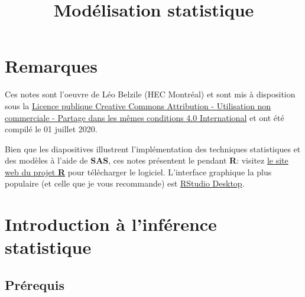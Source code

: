 \documentclass[
  11pt,
  letterpaper,
]{book}
\title{Modélisation statistique}
\author{}
\date{\vspace{-2.5em}}
\let\oldhref\href
\renewcommand{\href}[2]{#2\footnote{\url{#1}}}
\begin{document}
\maketitle

\let\href\oldhref

{
\setcounter{tocdepth}{1}
\tableofcontents
}
\hypertarget{remarques}{%
\chapter*{Remarques}\label{remarques}}

Ces notes sont l'oeuvre de Léo Belzile (HEC Montréal) et sont mis à disposition sous la \href{https://creativecommons.org/licenses/by-nc-sa/4.0/legalcode.fr}{Licence publique Creative Commons Attribution - Utilisation non commerciale - Partage dans les mêmes conditions 4.0 International} et ont été compilé le 01 juillet 2020.

Bien que les diapositives illustrent l'implémentation des techniques statistiques et des modèles à l'aide de \textbf{SAS}, ces notes présentent le pendant \textbf{R}: visitez \href{https://cran.r-project.org/}{le site web du projet \textbf{R}} pour télécharger le logiciel. L'interface graphique la plus populaire (et celle que je vous recommande) est \href{https://www.rstudio.com/products/rstudio/download/}{RStudio Desktop}.

\newcommand{\bs}[1]{\boldsymbol{#1}}
\newcommand{\Hmat}{\mathbf{H}}
\newcommand{\Mmat}{\mathbf{M}}
\newcommand{\mX}{\mathbf{X}}
\newcommand{\bX}{{\mathbf{X}}}
\newcommand{\bx}{{\mathbf{x}}}
\newcommand{\by}{{\boldsymbol{y}}}
\newcommand{\bY}{{\boldsymbol{Y}}}
\newcommand{\eps}{\varepsilon}
\newcommand{\beps}{\boldsymbol{\varepsilon}}
\newcommand{\bbeta}{\boldsymbol{\beta}}
\newcommand{\hbb}{\widehat{\boldsymbol{\beta}}}
\newcommand{\limni}{\lim_{n \ra \infty}}
\newcommand{\pr}{{\mathsf Pr}{}}
\newcommand{\E}[2][]{{\mathsf E}_{#1}\left(#2\right)}
\newcommand{\Va}[2][]{{\mathsf{Var}_{#1}}\left(#2\right)}
\newcommand{\I}[1]{{\mathbf 1}_{#1}}
\renewcommand{\d}{\mathrm{d}}

\hypertarget{intro}{%
\chapter{Introduction à l'inférence statistique}\label{intro}}

\hypertarget{pruxe9requis}{%
\section{Prérequis}\label{pruxe9requis}}
\end{document}
